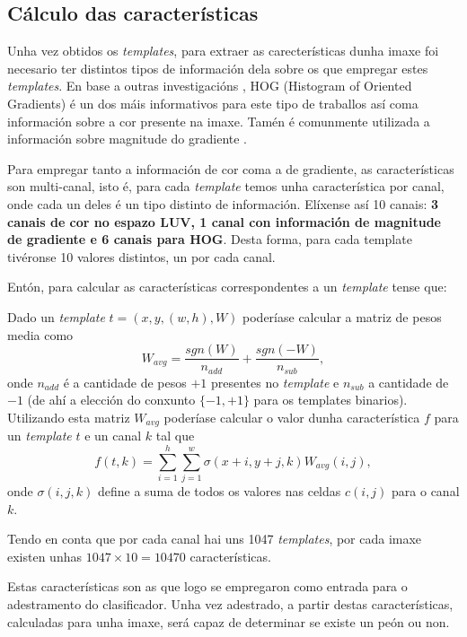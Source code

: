 \documentclass[galician]{./head/uvigo-tfg}
\begin{document}
        \subsection{Cálculo das características} Unha vez obtidos os \textit{templates}, para extraer as carecterísticas dunha imaxe foi necesario ter distintos tipos de información dela sobre os que empregar estes \textit{templates}. En base a outras investigacións \cite{dollar2009integral}\cite{zhang}\cite{filtered}, HOG (Histogram of Oriented Gradients) é un dos máis informativos para este tipo de traballos así coma información sobre a cor presente na imaxe. Tamén é comunmente utilizada a información sobre magnitude do gradiente \cite{alarcon}.
        \par Para empregar tanto a información de cor coma a de gradiente, as características son multi-canal, isto é, para cada \textit{template} temos unha característica por canal, onde cada un deles é un tipo distinto de información. Elíxense así 10 canais:\textbf{ 3 canais de cor no espazo LUV, 1 canal con información de magnitude de gradiente e 6 canais para HOG}. Desta forma, para cada template tivéronse 10 valores distintos, un por cada canal.
        \par Entón, para calcular as características correspondentes a un \textit{template} tense que:
        \par Dado un \textit{template} $t=(x,y,(w,h),W)$ poderíase calcular a matriz de pesos media como
        \begin{equation}
            W_{avg}=\frac{sgn(W)}{n_{add}} + \frac{sgn(-W)}{n_{sub}},
        \end{equation}
        onde  $n_{add}$ é a cantidade de pesos $+1$ presentes no \textit{template} e $n_{sub}$ a cantidade de $-1$ (de ahí a elección do conxunto $\{-1,+1\}$ para os templates binarios). Utilizando esta matriz $W_{avg}$ poderíase calcular o valor dunha característica $f$ para un \textit{template} $t$ e un canal $k$ tal que
        \begin{equation}
            f(t,k)=\sum_{i=1}^h \sum_{j=1}^w \sigma(x+i,y+j,k)W_{avg}(i,j),
        \end{equation}
        onde $\sigma(i,j,k)$ define a suma de todos os valores nas celdas $c(i,j)$ para o canal $k$.
        \par Tendo en conta que por cada canal hai uns 1047 \textit{templates}, por cada imaxe existen unhas $1047 \times 10=10470$ características.
        \par Estas características son as que logo se empregaron como entrada para o adestramento do clasificador. Unha vez adestrado, a partir destas características, calculadas para unha imaxe, será capaz de determinar se existe un peón ou non.
\end{document}
